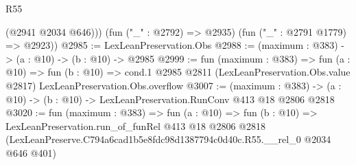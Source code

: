 \begin{lexlean}{R55}
\begin{coremodule}
          (@2941 @2034 @646)))
      (fun ("_" : @2792) => @2935)
      (fun ("_" : @2791 @1779) => @2923))
@2985 := LexLeanPreservation.Obs
@2988 := (maximum : @383) -> (a : @10) -> (b : @10) -> @2985
@2999 := fun (maximum : @383) =>
  fun (a : @10) =>
  fun (b : @10) =>
  cond.{1} @2985 @2811 (LexLeanPreservation.Obs.value @2817) LexLeanPreservation.Obs.overflow
@3007 := (maximum : @383) ->
  (a : @10) -> (b : @10) -> LexLeanPreservation.RunConv @413 @18 @2806 @2818
@3020 := fun (maximum : @383) =>
  fun (a : @10) =>
  fun (b : @10) =>
  LexLeanPreservation.run_of_funRel
    @413
    @18
    @2806
    @2818
    (LexLeanPreserve.C794a6cad1b5e8fdc98d1387794c0d40c.R55.__rel_0 @2034 @646 @401)
\end{coremodule}
\end{lexlean}
